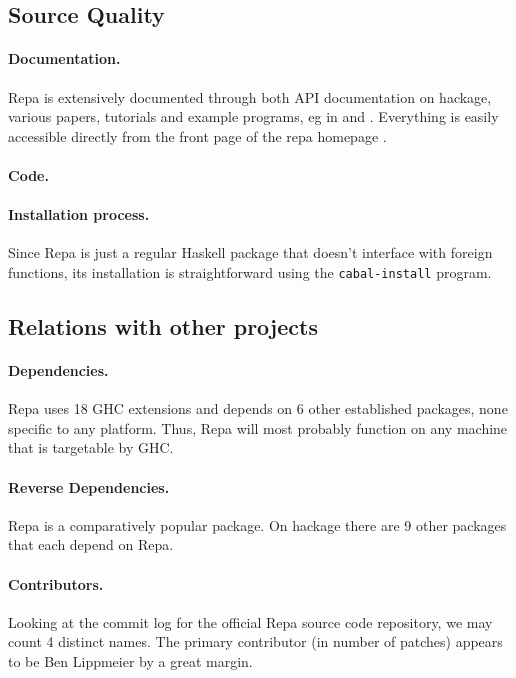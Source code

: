\subsection{Source Quality}

\paragraph{Documentation.} Repa is extensively documented through both API
documentation on hackage, various papers, tutorials and example programs, eg in
\cite{lippmeier2012guiding} and \cite{keller2010regular}.  Everything is easily
accessible directly from the front page of the repa homepage
\cite{homepage:repa}.

\paragraph{Code.}
\todo{\ldots}

\paragraph{Installation process.} Since Repa is just a regular Haskell package
that doesn't interface with foreign functions, its installation is
straightforward using the \texttt{cabal-install} program.

\subsection{Relations with other projects}

\paragraph{Dependencies.} %
Repa uses 18 GHC extensions and depends on 6 other established packages, none
specific to any platform. Thus, Repa will most probably function on any
machine that is targetable by GHC.

\paragraph{Reverse Dependencies.} Repa is a comparatively popular package. On
hackage there are 9 other packages that each depend on Repa.

\paragraph{Contributors.} Looking at the commit log for the official Repa
source code repository, we may count 4 distinct names. The primary contributor
(in number of patches) appears to be Ben Lippmeier by a great margin.

